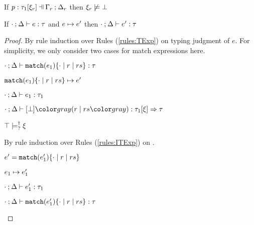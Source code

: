 \begin{lem}
  \label{lem:not-entail-falsity}
  If $\chpattyp{p}{\tau_1}{\xi_r}{\Gamma_r}{\Delta_r}$ then $\xi_r \not\models \bot$
\end{lem}

\newpage

\begin{thm}[Preservation]
  \label{thrm:preservation}
  If $\cdot \mathbin{;} \Delta \vdash e : \tau$ and $e \mapsto e'$
  then $\cdot \mathbin{;} \Delta \vdash e' : \tau$
\end{thm}
\begin{proof}
By rule induction over Rules (\ref{rules:TExp}) on typing judgment of $e$.
For simplicity, we only consider two cases for match expressions here.
\begin{byCases}
\item[\text{(\ref{rule:TMatchZPre})}]
  \begin{pfsteps*}
  \item $\cdot \mathbin{;} \Delta \vdash \mathtt{match}(e_1) \{\cdot \mid r \mid rs\} : \tau$  
  \item $\mathtt{match}(e_1) \{\cdot \mid r \mid rs\} \mapsto e'$  
  \item $\cdot \mathbin{;} \Delta \vdash e_1 : \tau_1$  
  \item $\chrulstyp{\cdot}{\Delta}{\cfalsity}{\hrulesP{r}{rs}}{\tau_1}{\xi}{\tau}$  
  \item $\top \models_{?}^{\dag} \xi$  
  \end{pfsteps*}
  By rule induction over Rules (\ref{rules:ITExp}) on .
  \begin{byCases}
    
  \item[\text{(\ref{rule:ITExpMatch})}]
    \begin{pfsteps*}
    \item $e' = \mathtt{match}(e_1') \{\cdot \mid r \mid rs\}$ 
    \item $e_1 \mapsto e_1'$  
    \item $\cdot \mathbin{;} \Delta \vdash e_1' : \tau_1$  
    \item $\cdot \mathbin{;} \Delta \vdash \mathtt{match}(e_1') \{\cdot \mid r \mid rs\} : \tau$ 
    \end{pfsteps*}


\end{byCases}
\end{byCases}
\end{proof}

